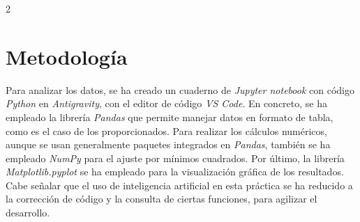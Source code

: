 \documentclass[a4paper]{article}
\numberwithin{equation}{section}
\begin{document}
\begin{multicols}{2}
	\section{Metodología}
	Para analizar los datos, se ha creado un cuaderno de \textit{Jupyter notebook} con código \textit{Python} en \textit{Antigravity}, con el editor de código \textit{VS Code}. En concreto, se ha empleado la librería \textit{Pandas} que permite manejar datos en formato de tabla, como es el caso de los proporcionados. Para realizar los cálculos numéricos, aunque se usan generalmente paquetes integrados en \textit{Pandas}, también se ha empleado \textit{NumPy} para el ajuste por mínimos cuadrados. Por último, la librería \textit{Matplotlib.pyplot} se ha empleado para la visualización gráfica de los resultados. Cabe señalar que el uso de inteligencia artificial en esta práctica se ha reducido a la corrección de código y la consulta de ciertas funciones, para agilizar el desarrollo.


\end{multicols}
\end{document}
